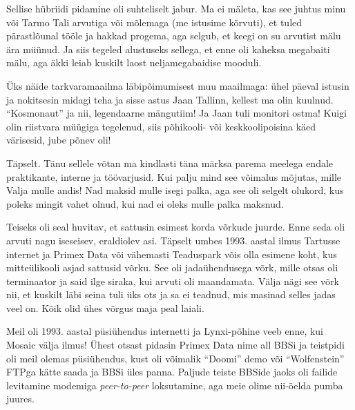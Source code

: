 Sellise hübriidi pidamine oli suhteliselt jabur. Ma ei mäleta, kas see juhtus minu 
või Tarmo Tali arvutiga või mõlemaga (me 
istusime kõrvuti), et tuled pärastlõunal tööle ja hakkad
progema, aga selgub, et keegi on su arvutist mälu ära müünud. Ja siis 
tegeled alustuseks sellega, et enne oli kaheksa megabaiti mälu, aga äkki leiab kuskilt
laost neljamegabaidise mooduli.

Üks näide tarkvaramaailma läbipõimumisest muu maailmaga: ühel päeval istusin ja 
nokitsesin midagi teha ja sisse astus Jaan Tallinn, 
kellest ma olin kuulnud. \enquote{Kosmonaut} ja nii, legendaarne mängutiim! Ja Jaan tuli 
monitori ostma! Kuigi olin riistvara müügiga tegelenud, siis põhikooli- või keskkoolipoisina käed värisesid, 
jube põnev oli!


Täpselt. Tänu sellele võtan ma kindlasti täna märksa
parema meelega endale praktikante, interne ja töövarjusid. Kui palju mind see 
võimalus mõjutas, mille Valja  mulle 
andis! Nad maksid mulle isegi palka, aga see oli selgelt olukord, kus poleks 
mingit vahet olnud, kui nad ei oleks mulle palka maksnud.

Teiseks oli seal huvitav, et sattusin esimest korda võrkude 
juurde. Enne seda oli arvuti nagu iseseisev, eraldiolev asi. Täpselt umbes 1993. aastal ilmus
Tartusse internet ja Primex Data 
või vähemasti Teaduspark võis olla esimene koht, kus 
mitteülikooli asjad sattusid võrku. See oli jadaühendusega võrk, mille otsas oli 
terminaator ja said ilge siraka, kui arvuti oli maandamata. Välja nägi see võrk
nii, et kuskilt läbi seina tuli üks ots ja sa ei teadnud, mis 
masinad selles jadas veel on. Kõik olid ühes võrgus maja peal laiali. 

Meil oli 
1993. aastal püsiühendus internetti ja Lynxi-põhine veeb enne, kui Mosaic 
välja ilmus! Ühest otsast pidasin Primex Data nime all BBSi ja teistpidi 
oli meil olemas püsiühendus, kust oli võimalik 
\enquote{Doomi} demo või \enquote{Wolfenstein} 
FTPga kätte saada ja BBSi üles panna. Paljude teiste 
BBSide jaoks oli failide levitamine modemiga 
\emph{peer-to-peer} loksutamine, aga meie olime nii-öelda pumba juures. 


